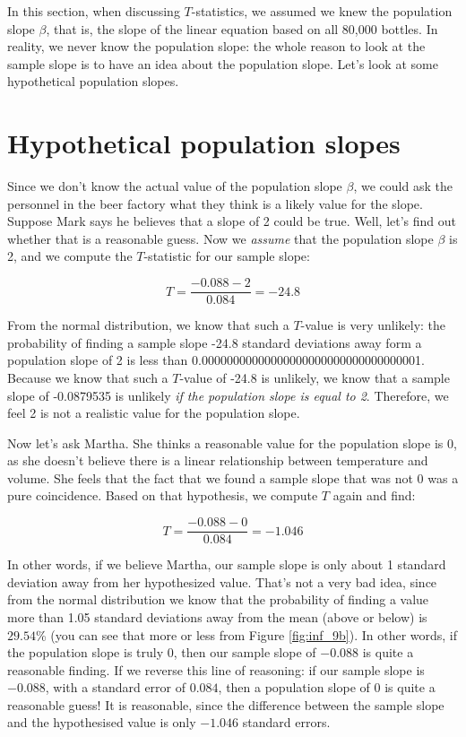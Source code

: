 \documentclass[]{book}\usepackage[]{graphicx}\usepackage[]{color}
\begin{document}
In this section, when discussing $T$-statistics, we assumed we knew the population slope $\beta$, that is, the slope of the linear equation based on all 80,000 bottles. In reality, we never know the population slope: the whole reason to look at the sample slope is to have an idea about the population slope. Let's look at some hypothetical population slopes.





\section{Hypothetical population slopes}


Since we don't know the actual value of the population slope $\beta$, we could ask the personnel in the beer factory what they think is a likely value for the slope. Suppose Mark says he believes that a slope of 2 could be true. Well, let's find out whether that is a reasonable guess. Now we \textit{assume} that the population slope $\beta$ is 2, and we compute the $T$-statistic for our sample slope:



\begin{equation}
T = \frac{-0.088-2}{0.084}= -24.8
\end{equation}

From the normal distribution, we know that such a $T$-value is very unlikely: the probability of finding a sample slope -24.8 standard deviations away form a population slope of 2 is less than 0.00000000000000000000000000000000001. Because we know that such a $T$-value of -24.8 is unlikely, we know that a sample slope of -0.0879535 is unlikely \textit{if the population slope is equal to 2}. Therefore, we feel 2 is not a realistic value for the population slope.


Now let's ask Martha. She thinks a reasonable value for the population slope is 0, as she doesn't believe there is a linear relationship between temperature and volume. She feels that the fact that we found a sample slope that was not 0 was a pure coincidence. Based on that hypothesis, we compute $T$ again and find:


\begin{equation}
T = \frac{-0.088-0}{0.084}= -1.046
\end{equation}

In other words, if we believe Martha, our sample slope is only about 1 standard deviation away from her hypothesized value. That's not a very bad idea, since from the normal distribution we know that the probability of finding a value more than 1.05 standard deviations away from the mean (above or below) is $29.54$\% (you can see that more or less from Figure \ref{fig:inf_9b}). In other words, if the population slope is truly 0, then our sample slope of $-0.088$ is quite a reasonable finding. If we reverse this line of reasoning: if our sample slope is $-0.088$, with a standard error of $0.084$, then a population slope of 0 is quite a reasonable guess! It is reasonable, since the difference between the sample slope and the hypothesised value is only $-1.046$ standard errors.
\end{document}
